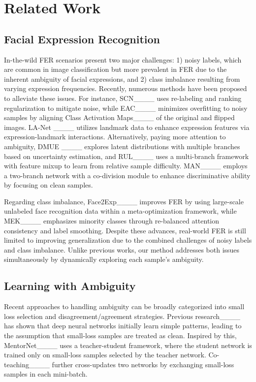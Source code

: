 \section{Related Work}
\subsection{Facial Expression Recognition}
In-the-wild FER scenarios present two major challenges: 1) noisy labels, which are common in image classification but more prevalent in FER due to the inherent ambiguity of facial expressions, and 2) class imbalance resulting from varying expression frequencies. 
Recently, numerous methods have been proposed to alleviate these issues. 
For instance, SCN____ uses re-labeling and ranking regularization to mitigate noise, while EAC____ minimizes overfitting to noisy samples by aligning Class Activation Maps____ of the original and flipped images.
LA-Net ____ utilizes landmark data to enhance expression features via expression-landmark interactions.  
Alternatively, paying more attention to ambiguity, DMUE ____ explores latent distributions with multiple branches based on uncertainty estimation, and RUL____ uses a multi-branch framework with feature mixup to learn from relative sample difficulty. MAN____ employs a two-branch network with a co-division module to enhance discriminative ability by focusing on clean samples.

Regarding class imbalance, Face2Exp____ improves FER by using large-scale unlabeled face recognition data within a meta-optimization framework, while MEK____ emphasizes minority classes through re-balanced attention consistency and label smoothing. Despite these advances, real-world FER is still limited to improving generalization due to the combined challenges of noisy labels and class imbalance. Unlike previous works, our method addresses both issues simultaneously by dynamically exploring each sample's ambiguity.

\subsection{Learning with Ambiguity}
Recent approaches to handling ambiguity can be broadly categorized into small loss selection and disagreement/agreement strategies. Previous research____ has shown that deep neural networks initially learn simple patterns, leading to the assumption that small-loss samples are treated as clean. Inspired by this, MentorNet____ uses a teacher-student framework, where the student network is trained only on small-loss samples selected by the teacher network. Co-teaching____ further cross-updates two networks by exchanging small-loss samples in each mini-batch.

